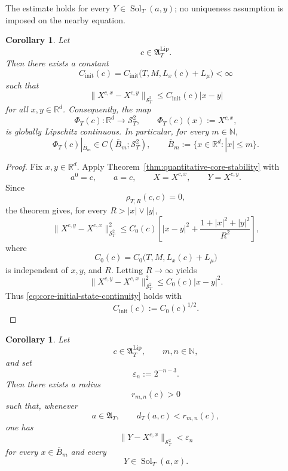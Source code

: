 \documentclass[12pt,oneside, reqno]{amsart}
\newtheorem{corollary}[theorem]{Corollary}
\numberwithin{equation}{section}
\begin{document}
	The estimate holds for every
	$Y\in\operatorname{Sol}_T(a,y)$; no uniqueness assumption is imposed
	on the nearby equation.
	
	\begin{corollary}
		\label{cor:core-initial-state-continuity}
		Let
		\[
		c\in\mathfrak A_T^{\mathrm{Lip}}.
		\]
		Then there exists a constant
		\[
		C_{\mathrm{init}}(c)
		=
		C_{\mathrm{init}}
		\bigl(T,M,L_x(c)+L_\mu\bigr)
		<\infty
		\]
		such that
		\begin{equation}
			\label{eq:core-initial-state-continuity}
			\|X^{c,x}-X^{c,y}\|_{\mathcal S_T^2}
			\leq
			C_{\mathrm{init}}(c)|x-y|
		\end{equation}
		for all $x,y\in\mathbb R^d$. Consequently, the map
		\[
		\Phi_T(c):
		\mathbb R^d\longrightarrow\mathcal S_T^2,
		\qquad
		\Phi_T(c)(x):=X^{c,x},
		\]
		is globally Lipschitz continuous. In particular, for every
		$m\in\mathbb N$,
		\[
		\Phi_T(c)|_{\overline B_m}
		\in
		C(\overline B_m;\mathcal S_T^2),
		\qquad
		\overline B_m:=\{x\in\mathbb R^d:|x|\leq m\}.
		\]
	\end{corollary}
	
	\begin{proof}
		Fix $x,y\in\mathbb R^d$. Apply
		Theorem~\ref{thm:quantitative-core-stability} with
		\[
		a^0=c,
		\qquad
		a=c,
		\qquad
		X=X^{c,x},
		\qquad
		Y=X^{c,y}.
		\]
		Since
		\[
		\rho_{T,R}(c,c)=0,
		\]
		the theorem gives, for every $R>|x|\vee|y|$,
		\[
		\|X^{c,y}-X^{c,x}\|_{\mathcal S_T^2}^2
		\leq
		C_0(c)
		\left[
		|x-y|^2
		+
		\frac{1+|x|^2+|y|^2}{R^2}
		\right],
		\]
		where
		\[
		C_0(c)=C_0\bigl(T,M,L_x(c)+L_\mu\bigr)
		\]
		is independent of $x,y$, and $R$. Letting $R\to\infty$ yields
		\[
		\|X^{c,y}-X^{c,x}\|_{\mathcal S_T^2}^2
		\leq
		C_0(c)|x-y|^2.
		\]
		Thus \eqref{eq:core-initial-state-continuity} holds with
		\[
		C_{\mathrm{init}}(c):=C_0(c)^{1/2}.
		\]
	\end{proof}
	
	\begin{corollary}
		\label{cor:uniform-stability-compact-initial-set}
		Let
		\[
		c\in\mathfrak A_T^{\mathrm{Lip}},
		\qquad
		m,n\in\mathbb N,
		\]
		and set
		\begin{equation}
			\label{eq:uniform-generic-epsilon}
			\varepsilon_n:=2^{-n-3}.
		\end{equation}
		Then there exists a radius
		\[
		r_{m,n}(c)>0
		\]
		such that, whenever
		\[
		a\in\mathfrak A_T,
		\qquad
		d_T(a,c)<r_{m,n}(c),
		\]
		one has
		\begin{equation}
			\label{eq:uniform-stability-compact-conclusion}
			\|Y-X^{c,x}\|_{\mathcal S_T^2}
			<
			\varepsilon_n
		\end{equation}
		for every $x\in\overline B_m$ and every
		\[
		Y\in\operatorname{Sol}_T(a,x).
		\]
	\end{corollary}
	
\end{document}
